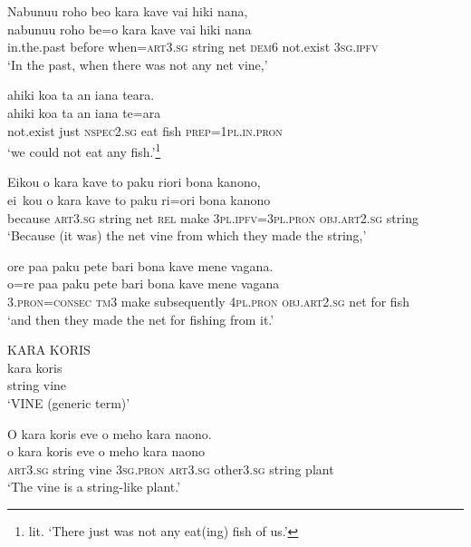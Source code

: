 \ea\label{ex:text7-19}
Nabunuu roho beo kara kave vai hiki nana,\\
\gll nabunuu	roho	be=o	kara	kave	vai	hiki	nana\\
     in.the.past	before	when=\textsc{art}3.\textsc{sg}	string	net	\textsc{dem}6	not.exist	3\textsc{sg}.\textsc{ipfv}\\
\glt `In the past, when there was not any net vine,'
\z

\ea\label{ex:text7-20}
ahiki koa ta an iana teara.\\
\gll ahiki	koa	ta	an	iana	te=ara\\
     not.exist	just	\textsc{nspec}2.\textsc{sg}	eat	fish	\textsc{prep}=1\textsc{pl}.\textsc{in}.\textsc{pron}\\
\glt `we could not eat any fish.'\footnote{lit. `There just was not any eat(ing) fish of us.'}
\z

\ea\label{ex:text7-21}
Eikou o kara kave to paku riori bona kanono,\\
\gll ei~kou	o	kara	kave	to	paku	ri=ori	bona	kanono\\
     because	\textsc{art}3.\textsc{sg}	string	net	\textsc{rel}	make	3\textsc{pl}.\textsc{ipfv}=3\textsc{pl}.\textsc{pron}	\textsc{obj}.\textsc{art}2.\textsc{sg}	string\\
\glt `Because (it was) the net vine from which they made the string,'
\z

\ea\label{ex:text7-22}
ore paa paku pete bari bona kave mene vagana.\\
\gll o=re	paa	paku	pete	bari	bona	kave	mene	vagana\\
     3.\textsc{pron}=\textsc{consec}	\textsc{tm}3	make	subsequently	4\textsc{pl}.\textsc{pron}	\textsc{obj}.\textsc{art}2.\textsc{sg}	net	for	fish\\
\glt `and then they made the net for fishing from it.'
\z

\ea\label{ex:text7-23}
KARA KORIS\\
\gll kara	koris\\
     string	vine\\
\glt `VINE (generic term)'
\z

\ea\label{ex:text7-24}
O kara koris eve o meho kara naono.\\
\gll o	kara	koris	eve	o	meho	kara	naono\\
     \textsc{art}3.\textsc{sg}	string	vine	3\textsc{sg}.\textsc{pron}	\textsc{art}3.\textsc{sg}	other3.\textsc{sg}	string	plant\\
\glt `The vine is a string-like plant.'
\z


